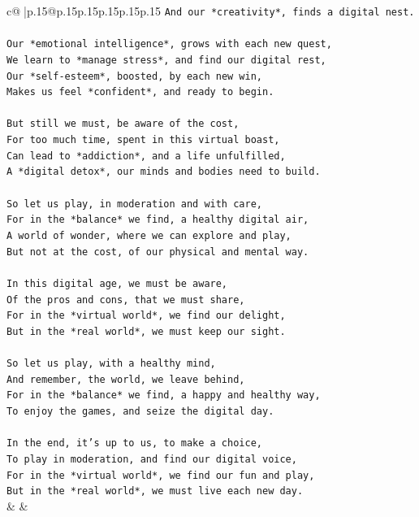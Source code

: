 \documentclass{article}
\begin{document}
{\begin{supertabular}{c@{$\;$}|p{.15\linewidth}@{}p{.15\linewidth}p{.15\linewidth}p{.15\linewidth}p{.15\linewidth}p{.15\linewidth}}
{{{\texttt{And our *creativity*, finds a digital nest.} \\
\\ 
\texttt{Our *emotional intelligence*, grows with each new quest,} \\
\texttt{We learn to *manage stress*, and find our digital rest,} \\
\texttt{Our *self{-}esteem*, boosted, by each new win,} \\
\texttt{Makes us feel *confident*, and ready to begin.} \\
\\ 
\texttt{But still we must, be aware of the cost,} \\
\texttt{For too much time, spent in this virtual boast,} \\
\texttt{Can lead to *addiction*, and a life unfulfilled,} \\
\texttt{A *digital detox*, our minds and bodies need to build.} \\
\\ 
\texttt{So let us play, in moderation and with care,} \\
\texttt{For in the *balance* we find, a healthy digital air,} \\
\texttt{A world of wonder, where we can explore and play,} \\
\texttt{But not at the cost, of our physical and mental way.} \\
\\ 
\texttt{In this digital age, we must be aware,} \\
\texttt{Of the pros and cons, that we must share,} \\
\texttt{For in the *virtual world*, we find our delight,} \\
\texttt{But in the *real world*, we must keep our sight.} \\
\\ 
\texttt{So let us play, with a healthy mind,} \\
\texttt{And remember, the world, we leave behind,} \\
\texttt{For in the *balance* we find, a happy and healthy way,} \\
\texttt{To enjoy the games, and seize the digital day.} \\
\\ 
\texttt{In the end, it's up to us, to make a choice,} \\
\texttt{To play in moderation, and find our digital voice,} \\
\texttt{For in the *virtual world*, we find our fun and play,} \\
\texttt{But in the *real world*, we must live each new day.} \\
            }
        }
    }
    & & \\ \\


\end{supertabular}}
\end{document}
